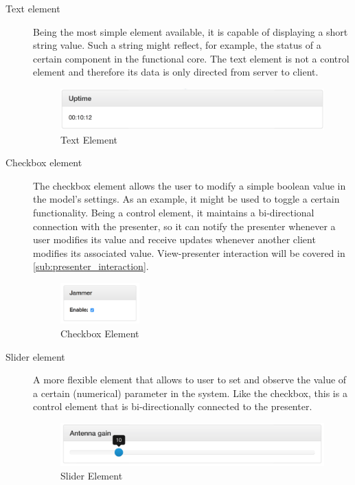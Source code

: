 \documentclass[a4paper, openany, oneside]{memoir}
\begin{document}
\begin{description}
	\item[Text element]
	Being the most simple element available, it is capable of displaying a short string value. Such a string might reflect, for example, the status of a certain component in the functional core. The text element is not a control element and therefore its data is only directed from server to client.

\begin{figure}[H]
    \centering
    \includegraphics[width=\textwidth]{figures/text.png}
    \caption{Text Element}
    \label{fig:text_element}
\end{figure}

	\item[Checkbox element]
	The checkbox element allows the user to modify a simple boolean value in the model's settings. As an example, it might be used to toggle a certain functionality. Being a control element, it maintains a bi-directional connection with the presenter, so it can notify the presenter whenever a user modifies its value and receive updates whenever another client modifies its associated value. View-presenter interaction will be covered in \cref{sub:presenter_interaction}.

\begin{figure}[H]
  \centering
    \includegraphics[width=0.3\textwidth]{figures/checkbox.png}
    \caption{Checkbox Element}
    \label{fig:checkbox_element}
\end{figure}

	\item[Slider element]
	A more flexible element that allows to user to set and observe the value of a certain (numerical) parameter in the system. Like the checkbox, this is a control element that is bi-directionally connected to the presenter.

\begin{figure}[H]
    \centering
    \includegraphics[width=\textwidth]{figures/slider.png}
    \caption{Slider Element}
    \label{fig:slider_element}
\end{figure}


\end{description}
\end{document}
